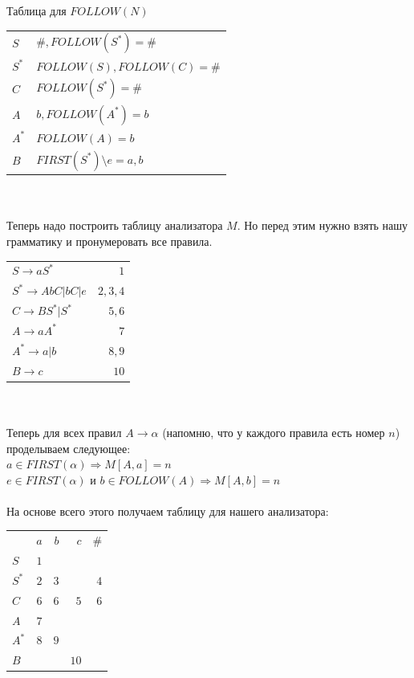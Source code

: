 \documentclass[14pt]{extreport}
\begin{document}
	Таблица для $FOLLOW(N)$ \\
	\begin{tabular}{ll}
			 $S$ & $\#,FOLLOW(S^*)=\#$ \\
			 $S^*$ & $FOLLOW(S),FOLLOW(C)=\#$ \\
			 $C$ & $FOLLOW(S^*)=\#$ \\
			 $A$ & $b,FOLLOW(A^*)=b$ \\
			 $A^*$ & $FOLLOW(A)=b$ \\
			 $B$ & $FIRST(S^*) \setminus e=a,b$ \\
	\end{tabular}\\\\
	\newpage
	Теперь надо построить таблицу анализатора $M$. Но перед этим нужно взять нашу грамматику
	и пронумеровать все правила.\\
	\begin{tabular}{lr}
		$S \to aS^*$ & $1$\\
		$S^* \to AbC | bC | e$ & $2,3,4$\\
		$C \to BS^* | S^*$ & $5, 6$\\
		$A \to aA^*$ & $7$\\
		$A^* \to a|b$ & $8,9$\\
		$B \to c$ & $10$\\
	\end{tabular}\\\\
	
	Теперь для всех правил $A \to \alpha$ (напомню, что у каждого правила есть номер $n$)
	проделываем следующее:\\
	\hspace*{30pt}$a \in FIRST(\alpha) \Rightarrow M[A, a] = n$\\
	\hspace*{30pt}$e \in FIRST(\alpha)$ и $b \in FOLLOW(A) \Rightarrow M[A, b] = n$\\\\
	На основе всего этого получаем таблицу для нашего анализатора:\\
	\begin{tabular}{lrrrr}
		& $a$ & $b$ & $c$ & $\#$\\
		$S$ & $1$\\
		$S^*$ & $2$ & $3$ & & $4$\\
		$C$ & $6$ & $6$ & $5$ & $6$\\
		$A$ & $7$\\
		$A^*$ & $8$ & $9$\\
		$B$ & & & $10$\\
	\end{tabular}\\\\
\end{document}

